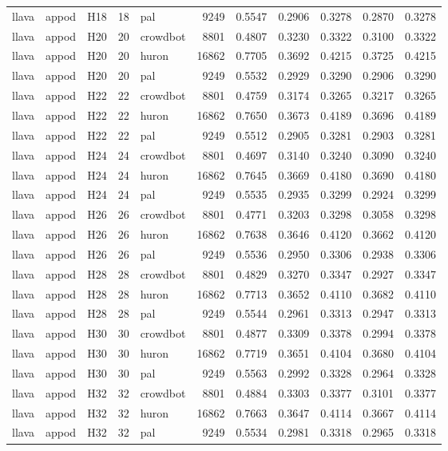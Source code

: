 \begin{table}[tbp]
\begin{tabular}{lllrlrrrrrr}
llava & appod & H18 & 18 & pal & 9249 & 0.5547 & 0.2906 & 0.3278 & 0.2870 & 0.3278 \\
llava & appod & H20 & 20 & crowdbot & 8801 & 0.4807 & 0.3230 & 0.3322 & 0.3100 & 0.3322 \\
llava & appod & H20 & 20 & huron & 16862 & 0.7705 & 0.3692 & 0.4215 & 0.3725 & 0.4215 \\
llava & appod & H20 & 20 & pal & 9249 & 0.5532 & 0.2929 & 0.3290 & 0.2906 & 0.3290 \\
llava & appod & H22 & 22 & crowdbot & 8801 & 0.4759 & 0.3174 & 0.3265 & 0.3217 & 0.3265 \\
llava & appod & H22 & 22 & huron & 16862 & 0.7650 & 0.3673 & 0.4189 & 0.3696 & 0.4189 \\
llava & appod & H22 & 22 & pal & 9249 & 0.5512 & 0.2905 & 0.3281 & 0.2903 & 0.3281 \\
llava & appod & H24 & 24 & crowdbot & 8801 & 0.4697 & 0.3140 & 0.3240 & 0.3090 & 0.3240 \\
llava & appod & H24 & 24 & huron & 16862 & 0.7645 & 0.3669 & 0.4180 & 0.3690 & 0.4180 \\
llava & appod & H24 & 24 & pal & 9249 & 0.5535 & 0.2935 & 0.3299 & 0.2924 & 0.3299 \\
llava & appod & H26 & 26 & crowdbot & 8801 & 0.4771 & 0.3203 & 0.3298 & 0.3058 & 0.3298 \\
llava & appod & H26 & 26 & huron & 16862 & 0.7638 & 0.3646 & 0.4120 & 0.3662 & 0.4120 \\
llava & appod & H26 & 26 & pal & 9249 & 0.5536 & 0.2950 & 0.3306 & 0.2938 & 0.3306 \\
llava & appod & H28 & 28 & crowdbot & 8801 & 0.4829 & 0.3270 & 0.3347 & 0.2927 & 0.3347 \\
llava & appod & H28 & 28 & huron & 16862 & 0.7713 & 0.3652 & 0.4110 & 0.3682 & 0.4110 \\
llava & appod & H28 & 28 & pal & 9249 & 0.5544 & 0.2961 & 0.3313 & 0.2947 & 0.3313 \\
llava & appod & H30 & 30 & crowdbot & 8801 & 0.4877 & 0.3309 & 0.3378 & 0.2994 & 0.3378 \\
llava & appod & H30 & 30 & huron & 16862 & 0.7719 & 0.3651 & 0.4104 & 0.3680 & 0.4104 \\
llava & appod & H30 & 30 & pal & 9249 & 0.5563 & 0.2992 & 0.3328 & 0.2964 & 0.3328 \\
llava & appod & H32 & 32 & crowdbot & 8801 & 0.4884 & 0.3303 & 0.3377 & 0.3101 & 0.3377 \\
llava & appod & H32 & 32 & huron & 16862 & 0.7663 & 0.3647 & 0.4114 & 0.3667 & 0.4114 \\
llava & appod & H32 & 32 & pal & 9249 & 0.5534 & 0.2981 & 0.3318 & 0.2965 & 0.3318 \\
\bottomrule
\end{tabular}
\end{table}
